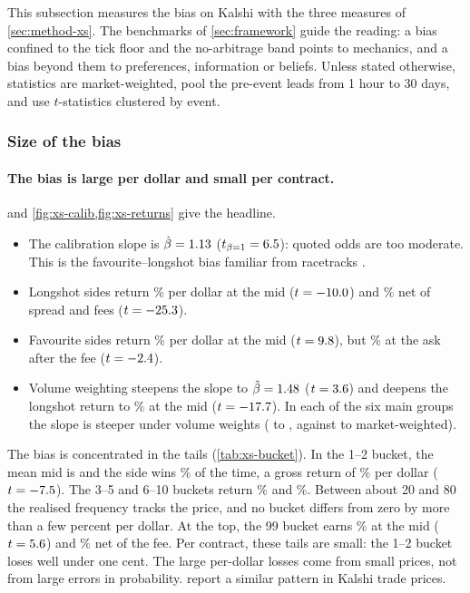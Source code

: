 
This subsection measures the bias on Kalshi with the three measures of \cref{sec:method-xs}. The
benchmarks of \cref{sec:framework} guide the reading: a bias confined to the tick floor and the
no-arbitrage band points to mechanics, and a bias beyond them to preferences, information or beliefs.
Unless stated otherwise, statistics are market-weighted, pool the pre-event leads from 1 hour to
30 days, and use $t$-statistics clustered by event.

\subsubsection{Size of the bias}\label{sec:res-xs-size}

\paragraph{The bias is large per dollar and small per contract.}
 and \cref{fig:xs-calib,fig:xs-returns} give the headline.
\begin{itemize}
\item The calibration slope is $\hat\beta=1.13$ ($t_{\beta=1}=6.5$): quoted odds are too
      moderate. This is the favourite--longshot bias familiar from racetracks
      \citep{griffith1949,thalerziemba1988,snowbergwolfers2010}.
\item Longshot sides return \xsAllLsMid\% per dollar at the mid ($t=-10.0$) and
      \xsAllLsNet\% net of spread and fees ($t=-25.3$).
\item Favourite sides return \xsAllFavMid\% per dollar at the mid ($t=9.8$), but
      \xsAllFavNet\% at the ask after the fee ($t=-2.4$).
\item Volume weighting steepens the slope to $\hat\beta=1.48$ ($t=3.6$) and
      deepens the longshot return to \xsAllVolLsMid\% at the mid ($t=-17.7$). In each of the
      six main groups the slope is steeper under volume weights (\xsGroupVolBetaMin{} to
      \xsGroupVolBetaMax, against \xsGroupBetaMin{} to \xsGroupBetaMax{} market-weighted).
\end{itemize}
The bias is concentrated in the tails (\cref{tab:xs-bucket}). In the 1--2\cents{} bucket, the mean
mid is \xsBOneQ\cents{} and the side wins \xsBOneWin\% of the time, a gross return of \xsBOneMid\% per
dollar ($t=-7.5$). The 3--5\cents{} and 6--10\cents{} buckets return \xsBThreeMid\% and
\xsBSixMid\%. Between about 20\cents{} and 80\cents{} the realised frequency tracks the price, and no
bucket differs from zero by more than a few percent per dollar. At the top, the 99\cents{} bucket
earns \xsBNinetyNineMid\% at the mid ($t=5.6$) and \xsBNinetyNineNet\% net of the fee.
Per contract, these tails are small: the 1--2\cents{} bucket loses well under one cent. The large
per-dollar losses come from small prices, not from large errors in probability. \citet{burgi2025}
report a similar pattern in Kalshi trade prices.

